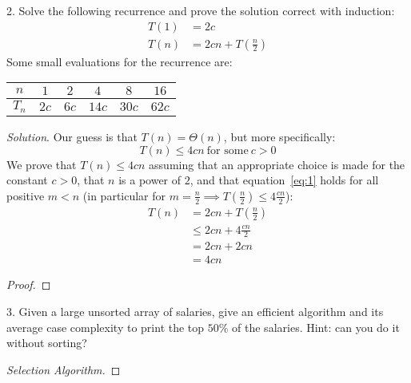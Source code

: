 \documentclass{scrartcl}
\begin{document}
\begin{flushleft}
    2. Solve the following recurrence and prove the solution correct with induction:
    \begin{align*}
        T(1) &= 2c\\
        T(n) &= 2cn + T(\frac{n}{2})
    \end{align*}
    Some small evaluations for the recurrence are:
    \medskip
    \begin{center}
        \begin{tabular}{|c|c|c|c|c|c|}
            \hline
            $n$ & $1$ & $2$ & $4$ & $8$ & $16$\\
            \hline
            $T_n$ & $2c$ & $6c$ & $14c$ & $30c$ & $62c$\\
            \hline
        \end{tabular}
    \end{center}
    \medskip
    \textit{Solution}. Our guess is that $T(n) = \Theta(n)$, but more specifically:
    \begin{equation}
        T(n) \leq 4cn\ \text{for some}\ c > 0
        \label{eq:1}
    \end{equation}
    We prove that $T(n) \leq 4cn$ assuming that an appropriate choice is made for the constant $c >
    0$, that $n$ is a power of $2$, and that equation~\ref{eq:1} holds for all positive $m < n$
    (in particular for $m = \frac{n}{2} \implies T(\frac{n}{2}) \leq 4\frac{cn}{2}$):
    \begin{align*}
        T(n) &= 2cn + T(\frac{n}{2})\\
        &\leq 2cn + 4\frac{cn}{2}\\
        &= 2cn + 2cn\\
        &= 4cn
    \end{align*}
    \begin{proof}
    \end{proof}
    \newpage
    3. Given a large unsorted array of salaries, give an efficient algorithm and its average case
    complexity to print the top $50\%$ of the salaries. Hint: can you do it without sorting?
    \begin{proof}[Selection Algorithm]\let\qed\relax

\end{proof}
\end{flushleft}
\end{document}
